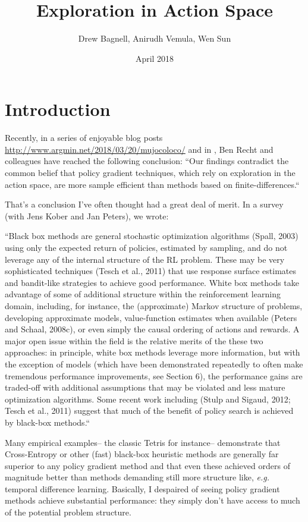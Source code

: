 \documentclass{article}
\title{Exploration in Action Space}
\author{Drew Bagnell, Anirudh Vemula, Wen Sun}
\date{April 2018}
\begin{document}
\maketitle

\section{Introduction}

Recently, in a series of enjoyable blog posts \url{http://www.argmin.net/2018/03/20/mujocoloco/} and in \cite{Mania}, Ben Recht and colleagues have reached the following conclusion:
``Our findings contradict the common belief that policy gradient techniques, which rely on exploration in the action space, are more sample efficient than methods based on
finite-differences.``

That's a conclusion I've often thought had a great deal of merit. In a survey (with Jens Kober and Jan Peters), we wrote:  

``Black box methods are general stochastic optimization algorithms (Spall, 2003) using only the expected return of policies, estimated by sampling, and do not leverage any of the internal structure of the RL problem. These may be very sophisticated techniques (Tesch et al., 2011) that use response surface estimates and bandit-like strategies to achieve good performance. White box methods take advantage of some of additional structure within the reinforcement learning domain, including, for instance, the (approximate) Markov structure of problems, developing approximate models, value-function estimates when available (Peters and Schaal, 2008c), or even simply the causal ordering of actions and rewards. A major open issue within the field is the relative merits of the these two approaches: in principle, white box methods leverage more information, but with the exception of models (which have been demonstrated repeatedly to often make tremendous performance improvements, see Section 6), the performance gains are traded-off with additional assumptions that may be violated and less mature optimization algorithms. Some recent work including (Stulp and Sigaud, 2012; Tesch et al., 2011) suggest that much of the benefit of policy search is achieved by black-box methods.``

Many empirical examples-- the classic Tetris for instance-- demonstrate that Cross-Entropy or other (fast) black-box heuristic methods are generally far superior to any policy gradient method and that even these achieved orders of magnitude better than methods demanding still more structure like, \textit{e.g.} temporal difference learning.  Basically, I despaired of seeing policy gradient methods achieve substantial performance: they simply don't have access to much of the potential problem structure.
\end{document}
